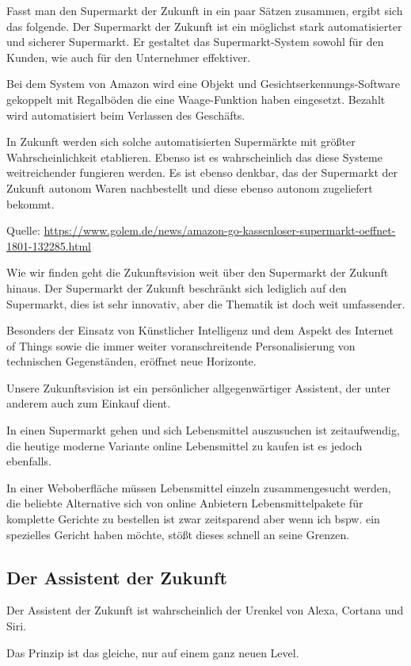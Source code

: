 \documentclass{sigchi}
\begin{document}
Fasst man den Supermarkt der Zukunft in ein paar Sätzen zusammen, ergibt sich das folgende. Der Supermarkt der Zukunft ist ein möglichst stark automatisierter und sicherer Supermarkt. Er gestaltet das Supermarkt-System sowohl für den Kunden, wie auch für den Unternehmer effektiver. 

Bei dem System von Amazon wird eine Objekt und Gesichtserkennungs-Software gekoppelt mit Regalböden die eine Waage-Funktion haben eingesetzt. Bezahlt wird automatisiert beim Verlassen des Geschäfts.  

In Zukunft werden sich solche automatisierten Supermärkte mit größter Wahrscheinlichkeit etablieren. Ebenso ist es wahrscheinlich das diese Systeme weitreichender fungieren werden. Es ist ebenso denkbar, das der Supermarkt der Zukunft autonom Waren nachbestellt und diese ebenso autonom zugeliefert bekommt.

Quelle: \url{https://www.golem.de/news/amazon-go-kassenloser-supermarkt-oeffnet-1801-132285.html}


Wie wir finden geht die Zukunftsvision weit über den Supermarkt der Zukunft hinaus.
Der Supermarkt der Zukunft beschränkt sich lediglich auf den Supermarkt, dies ist sehr innovativ, aber die Thematik ist doch weit umfassender.

Besonders der Einsatz von Künstlicher Intelligenz und dem Aspekt des Internet of Things sowie die immer weiter voranschreitende Personalisierung von technischen Gegenständen, eröffnet neue Horizonte.

Unsere Zukunftsvision ist ein persönlicher allgegenwärtiger Assistent, der unter anderem auch zum Einkauf dient.

In einen Supermarkt gehen und sich Lebensmittel auszusuchen ist zeitaufwendig, die heutige moderne Variante online Lebensmittel zu kaufen ist es jedoch ebenfalls.

In einer Weboberfläche müssen Lebensmittel einzeln zusammengesucht werden, die beliebte Alternative sich von online Anbietern Lebensmittelpakete für komplette Gerichte zu bestellen ist zwar zeitsparend aber wenn ich bspw. ein spezielles Gericht haben möchte, stößt dieses schnell an seine Grenzen. 

\subsection{Der Assistent der Zukunft}
Der Assistent der Zukunft ist wahrscheinlich der Urenkel von Alexa, Cortana und Siri.

Das Prinzip ist das gleiche, nur auf einem ganz neuen Level.
\end{document}
